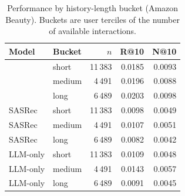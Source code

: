 \begin{table}[t]
\centering
\caption{Performance by history-length bucket (Amazon Beauty). Buckets are user terciles of the number of available interactions.}
\label{tab:sparsity}
\small
\begin{tabular}{llrrr}
\toprule
Model & Bucket & $n$ & R@10 & N@10 \\
\midrule
\model{} & short & 11\,383 & 0.0185 & 0.0093 \\
\model{} & medium & 4\,491 & 0.0196 & 0.0088 \\
\model{} & long & 6\,489 & 0.0203 & 0.0098 \\
\midrule
SASRec & short & 11\,383 & 0.0098 & 0.0049 \\
SASRec & medium & 4\,491 & 0.0107 & 0.0051 \\
SASRec & long & 6\,489 & 0.0082 & 0.0042 \\
\midrule
LLM-only & short & 11\,383 & 0.0109 & 0.0048 \\
LLM-only & medium & 4\,491 & 0.0143 & 0.0057 \\
LLM-only & long & 6\,489 & 0.0091 & 0.0045 \\
\bottomrule
\end{tabular}
\end{table}
